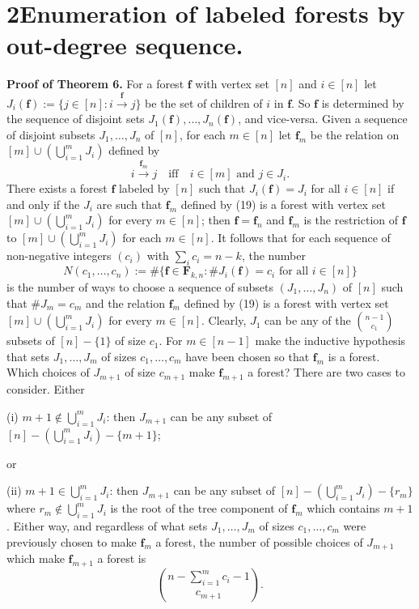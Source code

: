 \section*{2\quad Enumeration of labeled forests by out-degree sequence.}

\noindent\textbf{Proof of Theorem 6.} For a forest $\mathbf{f}$ with vertex set $[n]$ and $i\in[n]$ let $J_i(\mathbf{f}):=\{j\in[n]: i\xrightarrow{\mathbf{f}} j\}$ be the set of children of $i$ in $\mathbf{f}$. So $\mathbf{f}$ is determined by the sequence of disjoint sets $J_1(\mathbf{f}),\ldots,J_n(\mathbf{f})$, and vice-versa. Given a sequence of disjoint subsets $J_1,\ldots,J_n$ of $[n]$, for each $m\in[n]$ let $\mathbf{f}_m$ be the relation on $[m]\cup(\bigcup_{i=1}^m J_i)$ defined by
\[
i\xrightarrow{\mathbf{f}_m} j \quad\text{iff}\quad i\in[m]\text{ and } j\in J_i. \tag{19}
\]
There exists a forest $\mathbf{f}$ labeled by $[n]$ such that $J_i(\mathbf{f})=J_i$ for all $i\in[n]$ if and only if the $J_i$ are such that $\mathbf{f}_m$ defined by (19) is a forest with vertex set $[m]\cup(\bigcup_{i=1}^m J_i)$ for every $m\in[n]$; then $\mathbf{f}=\mathbf{f}_n$ and $\mathbf{f}_m$ is the restriction of $\mathbf{f}$ to $[m]\cup(\bigcup_{i=1}^m J_i)$ for each $m\in[n]$. It follows that for each sequence of non-negative integers $(c_i)$ with $\sum_i c_i=n-k$, the number
\[
N(c_1,\ldots,c_n):=\#\{\mathbf{f}\in\mathbf{F}_{k,n}: \#J_i(\mathbf{f})=c_i \text{ for all } i\in[n]\} \tag{20}
\]
is the number of ways to choose a sequence of subsets $(J_1,\ldots,J_n)$ of $[n]$ such that $\#J_m=c_m$ and the relation $\mathbf{f}_m$ defined by (19) is a forest with vertex set $[m]\cup(\bigcup_{i=1}^m J_i)$ for every $m\in[n]$. Clearly, $J_1$ can be any of the $\binom{n-1}{c_1}$ subsets of $[n]-\{1\}$ of size $c_1$. For $m\in[n-1]$ make the inductive hypothesis that sets $J_1,\ldots,J_m$ of sizes $c_1,\ldots,c_m$ have been chosen so that $\mathbf{f}_m$ is a forest. Which choices of $J_{m+1}$ of size $c_{m+1}$ make $\mathbf{f}_{m+1}$ a forest? There are two cases to consider. Either

(i) $m+1\notin\bigcup_{i=1}^m J_i$: then $J_{m+1}$ can be any subset of $[n]-(\bigcup_{i=1}^m J_i)-\{m+1\}$;

or

(ii) $m+1\in\bigcup_{i=1}^m J_i$: then $J_{m+1}$ can be any subset of $[n]-(\bigcup_{i=1}^m J_i)-\{r_m\}$ where $r_m\notin\bigcup_{i=1}^m J_i$ is the root of the tree component of $\mathbf{f}_m$ which contains $m+1$. Either way, and regardless of what sets $J_1,\ldots,J_m$ of sizes $c_1,\ldots,c_m$ were previously chosen to make $\mathbf{f}_m$ a forest, the number of possible choices of $J_{m+1}$ which make $\mathbf{f}_{m+1}$ a forest is
\[
\binom{n-\sum_{i=1}^m c_i-1}{c_{m+1}}.
\]

